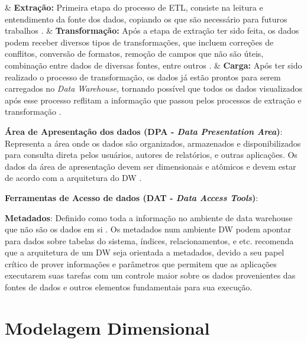 \begin{easylist}[itemize]

	& \textbf{Extração: } Primeira etapa do processo de ETL, consiste na leitura e entendimento da fonte 		dos dados, copiando os que são necessário para futuros trabalhos \cite{Kimball2002}.  
	& \textbf{Transformação: } Após a etapa de extração ter sido feita, os dados podem receber diversos tipos de transformações, que incluem correções de conflitos, conversão de formatos, remoção de campos que não são úteis, combinação entre dados de diversas fontes, entre outros \cite{Kimball2002}.
	& \textbf{Carga: } Após ter sido realizado o processo de transformação, os dados já estão prontos para serem carregados no \textit{Data Warehouse}, tornando possível que todos os dados visualizados após esse processo reflitam a informação que passou pelos processos de extração e transformação \cite{neeraj_sharma_2011}.  

	\end{easylist}


\textbf{Área de Apresentação dos dados (DPA - \textit{Data Presentation Area})}:
Representa a área onde os dados são organizados, armazenados e disponibilizados para consulta direta pelos usuários, autores de relatórios, e outras aplicações. Os dados da área de apresentação devem ser dimensionais e atômicos e devem estar de acordo com a arquitetura do DW \cite{Kimball2002}.


\textbf{Ferramentas de Acesso de dados (DAT - \textit{Data Access Tools})}:

\textbf{Metadados}: Definido como toda a informação no ambiente de data warehouse que não são os dados em si \cite{Kimball2002}. Os metadados num ambiente DW podem apontar para dados sobre tabelas do sistema, índices, relacionamentos, e etc.  recomenda que a arquitetura de um DW seja orientada a metadados, devido a seu papel crítico de prover informações e parâmetros que permitem que as aplicações executarem suas tarefas com um controle maior sobre os dados provenientes das fontes de dados e outros elementos fundamentais para sua execução.


\section{Modelagem Dimensional}

